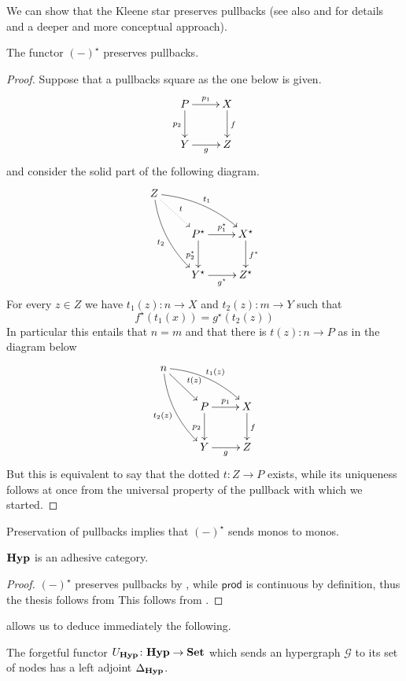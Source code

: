 \documentclass[runningheads,envcountsect]{llncs}
\newcommand{\catname}[1]{\textbf{\textup{#1}}}
\newcommand{\hyp}{\catname{Hyp}}
\newcommand{\pro}{\mathsf{prod}}
\begin{document}
We can show that the  Kleene star preserves pullbacks (see also \cite[Sec. 3]{carboni1995connected}  and \cite[Ch.4]{leinster2004higher} for details and a deeper and more conceptual approach).

\begin{proposition}\label{prop:pb}
	The functor $(-)^\star$ preserves pullbacks.
\end{proposition}
\begin{proof}
	Suppose that a pullbacks square as the one below is given.
	\[\xymatrix{P \ar[r]^{p_1} \ar[d]_{p_2}& X \ar[d]^{f}\\ Y \ar[r]_{g} & Z}\]
	and consider the solid part of the following diagram.
	\[\xymatrix{Z\ar@{.>}[dr]^{t} \ar@/^.3cm/[drr]^{t_1} \ar@/_.3cm/[ddr]_{t_2}\\&P^\star \ar[r]^{p^\star_1} \ar[d]_{p^\star_2}& X^\star \ar[d]^{f^\star}\\ &Y^\star \ar[r]_{g^\star} & Z^\star}\]
	For every $z\in Z$ we have $t_1(z)\colon n\to X$ and $t_2(z)\colon m\to Y$ such that
	\[f^\star(t_1(x))=g^\star(t_2(z))\]
	In particular this entails that $n=m$ and that there is $t(z)\colon n\to P$ as in the diagram below 
	\[\xymatrix{n\ar[dr]^{t(z)} \ar@/^.3cm/[drr]^{t_1(z)} \ar@/_.3cm/[ddr]_{t_2(z)}\\&P \ar[r]^{p_1} \ar[d]_{p_2}& X \ar[d]^{f}\\ &Y \ar[r]_{g} & Z}\]
	But this is equivalent to say that the dotted $t\colon Z\to P$ exists, while its uniqueness follows at once from the universal property of the pullback with which we started.
\end{proof}

\begin{remark}\label{rem:mono}
	Preservation of pullbacks implies that $(-)^\star$ sends monos to monos.
\end{remark}

\begin{corollary}\label{prop:hypadh}
	$\hyp$ is an adhesive category.
\end{corollary}
\begin{proof}
	$(-)^\star$ preserves pullbacks by , while $\pro$ is continuous by definition, thus the thesis follows from This follows from .
\end{proof}



 allows us to deduce immediately the following.

\begin{proposition}\label{cor:left}
	The forgetful functor $U_{\catname{Hyp}}\colon \hyp \to \catname{Set}$ which sends an hypergraph $\mathcal{G}$ to its set of nodes has a left adjoint $\Delta_{\hyp}$.
\end{proposition}
\end{document}
